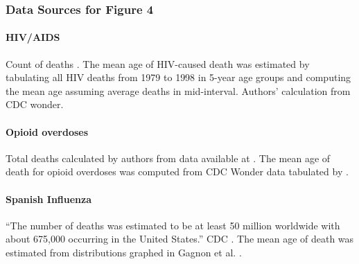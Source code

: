 \documentclass[9pt,twocolumn,twoside,lineno]{pnas-new}
\begin{document}
{\subsubsection*{Data Sources for Figure 4}

\paragraph{HIV/AIDS}

    Count of deaths \cite{cdc:2016}. The mean age of HIV-caused death was estimated by tabulating all HIV
deaths from 1979 to 1998 in 5-year age groups and computing the mean
age assuming average deaths in mid-interval. Authors' calculation from
CDC wonder.



\paragraph{Opioid overdoses}
  
Total deaths calculated by authors from data available at \cite{nida:2020}.
The mean age of death for opioid overdoses was computed from CDC
Wonder data tabulated by \cite{kff:2020}.

\paragraph{Spanish Influenza}

  ``The number of deaths was estimated to be at least 50 million worldwide with about 675,000 occurring in the United States.''
  CDC \cite{cdc:2019}.  
The mean age of death was estimated from distributions graphed in Gagnon et al. \cite{gagnon:2013}.


}

\appendix

\showmatmethods{} %

\showacknow{} %


\end{document}
